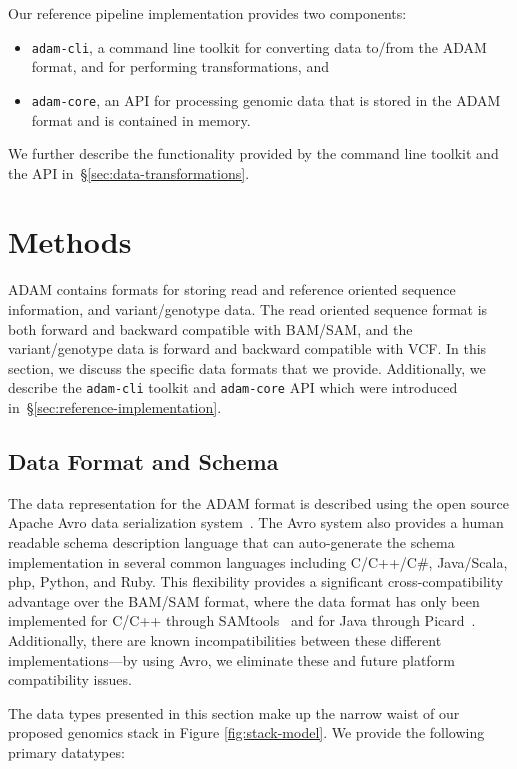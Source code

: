 \documentclass{bioinfo}
\begin{document}
Our reference pipeline implementation provides two components:

\begin{itemize}
\item \texttt{adam-cli}, a command line toolkit for converting data to/from the ADAM format, and for performing transformations, and
\item \texttt{adam-core}, an API for processing genomic data that is stored in the ADAM format and is contained in memory.
\end{itemize}

\noindent We further describe the functionality provided by the command line toolkit and the API in~\S\ref{sec:data-transformations}.

\section{Methods}
\label{sec:methods}

ADAM contains formats for storing read and reference oriented sequence information, and variant/genotype data. The read oriented sequence format is both forward and
backward compatible with BAM/SAM, and the variant/genotype data is forward and backward compatible with VCF. In this section, we discuss the specific data formats
that we provide. Additionally, we describe the \texttt{adam-cli} toolkit and \texttt{adam-core} API which were introduced in~\S\ref{sec:reference-implementation}.

\subsection{Data Format and Schema}
\label{sec:data-format-and-schema}

The data representation for the ADAM format is described using the open source Apache Avro data serialization system~\citep{avro}. The Avro system also provides a human
readable schema description language that can auto-generate the schema implementation in several common languages including C/C++/C\#, Java/Scala, php, Python, and
Ruby. This flexibility provides a significant cross-compatibility advantage over the BAM/SAM format, where the data format has only been implemented for C/C++ through
SAMtools~\citep{li09} and for Java through Picard~\citep{picard}. Additionally, there are known incompatibilities between these different implementations---by using Avro,
we eliminate these and future platform compatibility issues.

The data types presented in this section make up the narrow waist of our proposed genomics stack in Figure \ref{fig:stack-model}. We provide the following primary datatypes:
\end{document}
